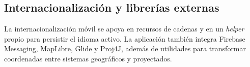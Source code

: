 \subsection{Internacionalización y librerías externas}

La internacionalización móvil se apoya en recursos de cadenas y en un \textit{helper} propio para persistir el idioma activo. La aplicación también integra Firebase Messaging, MapLibre, Glide y Proj4J, además de utilidades para transformar coordenadas entre sistemas geográficos y proyectados.
